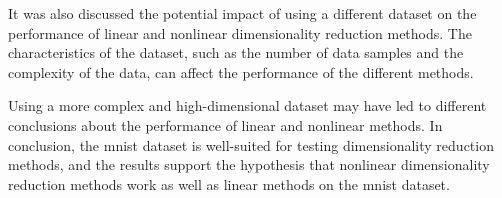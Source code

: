 It was also discussed the potential impact of using a different dataset on the performance of linear and nonlinear dimensionality reduction methods. The characteristics of the dataset, such as the number of data samples and the complexity of the data, can affect the performance of the different methods.

Using a more complex and high-dimensional dataset may have led to different conclusions about the performance of linear and nonlinear methods. In conclusion, the \gls{mnist} dataset is well-suited for testing dimensionality reduction methods, and the results support the hypothesis that nonlinear dimensionality reduction methods work as well as linear methods on the \gls{mnist} dataset.